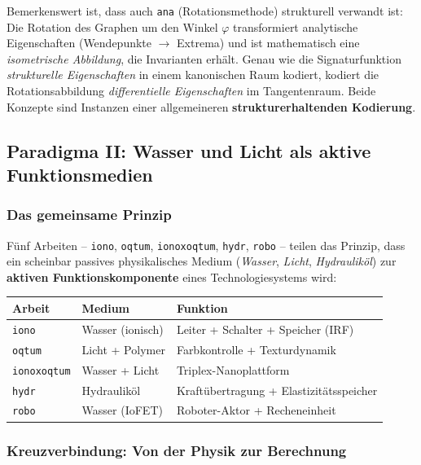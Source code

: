 ﻿\documentclass[a4paper,12pt]{scrreprt}
\theoremstyle{definition}
\begin{document}
Bemerkenswert ist, dass auch \texttt{ana} (Rotationsmethode) strukturell
verwandt ist: Die Rotation des Graphen um den Winkel $\varphi$ transformiert
analytische Eigenschaften (Wendepunkte $\to$ Extrema) und ist mathematisch
eine \emph{isometrische Abbildung}, die Invarianten erhält. Genau wie die
Signaturfunktion \emph{strukturelle Eigenschaften} in einem kanonischen Raum
kodiert, kodiert die Rotationsabbildung \emph{differentielle Eigenschaften}
im Tangentenraum. Beide Konzepte sind Instanzen einer allgemeineren
\textbf{strukturerhaltenden Kodierung}.

\subsection{Paradigma II: Wasser und Licht als aktive Funktionsmedien}
\label{ssec:paradigma2}

\subsubsection{Das gemeinsame Prinzip}

Fünf Arbeiten -- \texttt{iono}, \texttt{oqtum}, \texttt{ionoxoqtum},
\texttt{hydr}, \texttt{robo} -- teilen das Prinzip, dass ein scheinbar
passives physikalisches Medium (\emph{Wasser}, \emph{Licht}, \emph{Hydrauliköl})
zur \textbf{aktiven Funktionskomponente} eines Technologiesystems wird:

\begin{center}
\begin{tabular}{lll}
\toprule
\textbf{Arbeit} & \textbf{Medium} & \textbf{Funktion} \\
\midrule
\texttt{iono}       & Wasser (ionisch) & Leiter + Schalter + Speicher (IRF) \\
\texttt{oqtum}      & Licht + Polymer  & Farbkontrolle + Texturdynamik \\
\texttt{ionoxoqtum} & Wasser + Licht   & Tri\-plex-Nano\-plattform \\
\texttt{hydr}       & Hydrauliköl      & Kraftübertragung + Elastizitätsspeicher \\
\texttt{robo}       & Wasser (IoFET)   & Roboter-Aktor + Recheneinheit \\
\bottomrule
\end{tabular}
\end{center}

\subsubsection{Kreuzverbindung: Von der Physik zur Berechnung}
\end{document}
